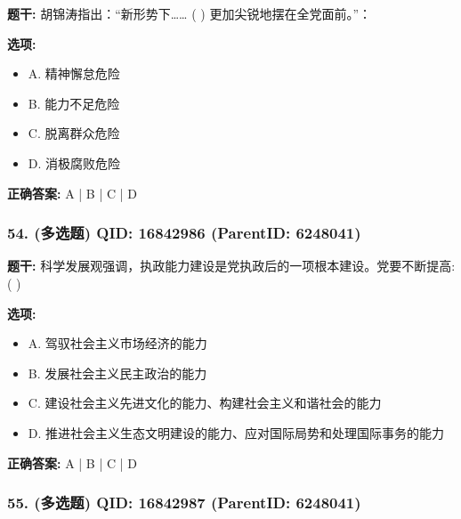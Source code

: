 \documentclass[12pt,UTF8]{ctexart}
\begin{document}
\textbf{题干:}
胡锦涛指出：“新形势下……  ( ) 更加尖锐地摆在全党面前。”：



\textbf{选项:}
\begin{itemize}[leftmargin=*]

  \item A. 精神懈怠危险

  \item B. 能力不足危险

  \item C. 脱离群众危险

  \item D. 消极腐败危险

\end{itemize}

\textbf{正确答案:}
A | B | C | D

\vspace{0.3em}\hrulefill\vspace{0.7em}

\subsubsection*{54. (多选题) \small QID: 16842986 (ParentID: 6248041)}

\textbf{题干:}
科学发展观强调，执政能力建设是党执政后的一项根本建设。党要不断提高: ( )



\textbf{选项:}
\begin{itemize}[leftmargin=*]

  \item A. 驾驭社会主义市场经济的能力

  \item B. 发展社会主义民主政治的能力

  \item C. 建设社会主义先进文化的能力、构建社会主义和谐社会的能力

  \item D. 推进社会主义生态文明建设的能力、应对国际局势和处理国际事务的能力

\end{itemize}

\textbf{正确答案:}
A | B | C | D

\vspace{0.3em}\hrulefill\vspace{0.7em}

\subsubsection*{55. (多选题) \small QID: 16842987 (ParentID: 6248041)}
\end{document}
